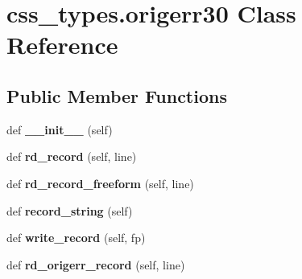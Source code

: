 \hypertarget{classcss__types_1_1origerr30}{}\section{css\+\_\+types.\+origerr30 Class Reference}
\label{classcss__types_1_1origerr30}
\subsection*{Public Member Functions}
\begin{DoxyCompactItemize}
\item 
\hypertarget{classcss__types_1_1origerr30_aa54c2df73d9f4a01eb980ca1ad456d3f}{}def {\bfseries \+\_\+\+\_\+init\+\_\+\+\_\+} (self)\label{classcss__types_1_1origerr30_aa54c2df73d9f4a01eb980ca1ad456d3f}

\item 
\hypertarget{classcss__types_1_1origerr30_acab70e9cc17832a17adb997523677443}{}def {\bfseries rd\+\_\+record} (self, line)\label{classcss__types_1_1origerr30_acab70e9cc17832a17adb997523677443}

\item 
\hypertarget{classcss__types_1_1origerr30_a5bd75b1be0c172d26f7e5fa2aea0153d}{}def {\bfseries rd\+\_\+record\+\_\+freeform} (self, line)\label{classcss__types_1_1origerr30_a5bd75b1be0c172d26f7e5fa2aea0153d}

\item 
\hypertarget{classcss__types_1_1origerr30_a734c05d20ba4009e07dbedef27d3e41b}{}def {\bfseries record\+\_\+string} (self)\label{classcss__types_1_1origerr30_a734c05d20ba4009e07dbedef27d3e41b}

\item 
\hypertarget{classcss__types_1_1origerr30_a95e560a0cf8e04621e2a0c27c1976143}{}def {\bfseries write\+\_\+record} (self, fp)\label{classcss__types_1_1origerr30_a95e560a0cf8e04621e2a0c27c1976143}

\item 
\hypertarget{classcss__types_1_1origerr30_ace12689c7d15d4a09ee17397b78be784}{}def {\bfseries rd\+\_\+origerr\+\_\+record} (self, line)\label{classcss__types_1_1origerr30_ace12689c7d15d4a09ee17397b78be784}

\end{DoxyCompactItemize}
